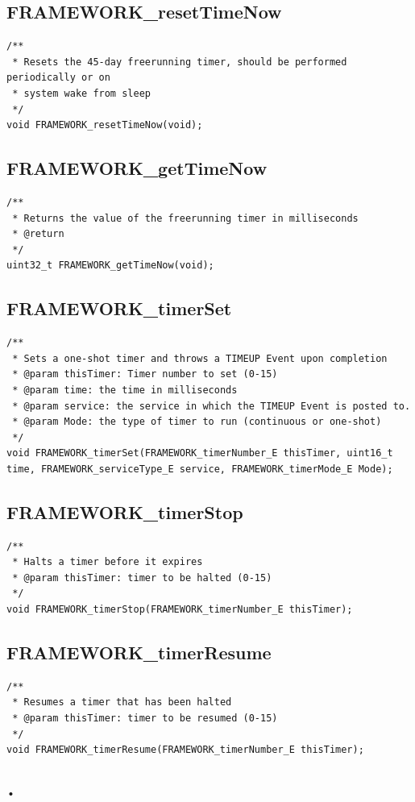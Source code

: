 \documentclass[12pt compsoc]{article}
\begin{document}
\subsection{FRAMEWORK\_resetTimeNow}
\begin{verbatim}
/**
 * Resets the 45-day freerunning timer, should be performed periodically or on 
 * system wake from sleep
 */
void FRAMEWORK_resetTimeNow(void);
\end{verbatim}

\subsection{FRAMEWORK\_getTimeNow}
\begin{verbatim}
/**
 * Returns the value of the freerunning timer in milliseconds
 * @return 
 */
uint32_t FRAMEWORK_getTimeNow(void);
\end{verbatim}

\subsection{FRAMEWORK\_timerSet}
\begin{verbatim}
/**
 * Sets a one-shot timer and throws a TIMEUP Event upon completion
 * @param thisTimer: Timer number to set (0-15)
 * @param time: the time in milliseconds
 * @param service: the service in which the TIMEUP Event is posted to.
 * @param Mode: the type of timer to run (continuous or one-shot)
 */
void FRAMEWORK_timerSet(FRAMEWORK_timerNumber_E thisTimer, uint16_t time, FRAMEWORK_serviceType_E service, FRAMEWORK_timerMode_E Mode);
\end{verbatim}

\subsection{FRAMEWORK\_timerStop}
\begin{verbatim}
/**
 * Halts a timer before it expires
 * @param thisTimer: timer to be halted (0-15)
 */
void FRAMEWORK_timerStop(FRAMEWORK_timerNumber_E thisTimer);
\end{verbatim}

\subsection{FRAMEWORK\_timerResume}
\begin{verbatim}
/**
 * Resumes a timer that has been halted
 * @param thisTimer: timer to be resumed (0-15)
 */
void FRAMEWORK_timerResume(FRAMEWORK_timerNumber_E thisTimer);


\end{verbatim}•
\end{document}
